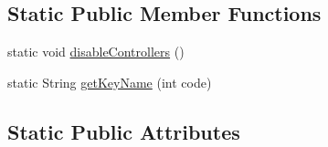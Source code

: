 \subsection*{Static Public Member Functions}
\begin{DoxyCompactItemize}
\item 
static void \mbox{\hyperlink{classorg_1_1newdawn_1_1slick_1_1_input_aca9004d417298157170d27c1667dad55}{disable\+Controllers}} ()
\item 
static String \mbox{\hyperlink{classorg_1_1newdawn_1_1slick_1_1_input_a9bc5a2712c000d451becb5107ca4d5b4}{get\+Key\+Name}} (int code)
\end{DoxyCompactItemize}
\subsection*{Static Public Attributes}
